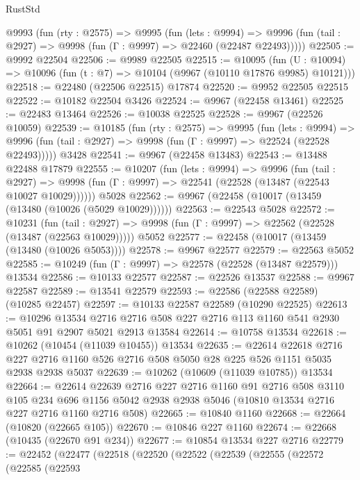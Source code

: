 \begin{lexlean}{RustStd}
\begin{coremodule}
{\begin{coremodule}
{{{{{{{{{{{{{{{{{{{{{{{{{{{{{{{{{{{{{{{{{{{{{{{{{{{{{{{{{{{{{{{{{{{{{{{{{{{{{{  @9993
    (fun (rty : @2575) =>
    @9995
      (fun (lets : @9994) =>
      @9996 (fun (tail : @2927) => @9998 (fun (Γ : @9997) => @22460 (@22487 @22493)))))
@22505 := @9992 @22504
@22506 := @9989 @22505
@22515 := @10095
    (fun (U : @10094) => @10096 (fun (t : @7) => @10104 (@9967 (@10110 @17876 @9985) @10121)))
@22518 := @22480 (@22506 @22515) @17874
@22520 := @9952 @22505 @22515
@22522 := @10182 @22504 @3426
@22524 := @9967 (@22458 @13461)
@22525 := @22483 @13464
@22526 := @10038 @22525
@22528 := @9967 (@22526 @10059)
@22539 := @10185
    (fun (rty : @2575) =>
    @9995
      (fun (lets : @9994) =>
      @9996 (fun (tail : @2927) => @9998 (fun (Γ : @9997) => @22524 (@22528 @22493)))))
    @3428
@22541 := @9967 (@22458 @13483)
@22543 := @13488 @22488 @17879
@22555 := @10207
    (fun (lets : @9994) =>
    @9996
      (fun (tail : @2927) =>
      @9998 (fun (Γ : @9997) => @22541 (@22528 (@13487 (@22543 @10027 @10029))))))
    @5028
@22562 := @9967 (@22458 (@10017 (@13459 (@13480 (@10026 (@5029 @10029))))))
@22563 := @22543 @5028
@22572 := @10231
    (fun (tail : @2927) => @9998 (fun (Γ : @9997) => @22562 (@22528 (@13487 (@22563 @10029)))))
    @5052
@22577 := @22458 (@10017 (@13459 (@13480 (@10026 @5053))))
@22578 := @9967 @22577
@22579 := @22563 @5052
@22585 := @10249 (fun (Γ : @9997) => @22578 (@22528 (@13487 @22579))) @13534
@22586 := @10133 @22577
@22587 := @22526 @13537
@22588 := @9967 @22587
@22589 := @13541 @22579
@22593 := @22586 (@22588 @22589) (@10285 @22457)
@22597 := @10133 @22587 @22589 (@10290 @22525)
@22613 := @10296
    @13534
    @2716
    @2716
    @508
    @227
    @2716
    @113
    @1160
    @541
    @2930
    @5051
    @91
    @2907
    @5021
    @2913
    @13584
@22614 := @10758 @13534
@22618 := @10262 (@10454 (@11039 @10455)) @13534
@22635 := @22614
    @22618
    @2716
    @227
    @2716
    @1160
    @526
    @2716
    @508
    @5050
    @28
    @225
    @526
    @1151
    @5035
    @2938
    @2938
    @5037
@22639 := @10262 (@10609 (@11039 @10785)) @13534
@22664 := @22614
    @22639
    @2716
    @227
    @2716
    @1160
    @91
    @2716
    @508
    @3110
    @105
    @234
    @696
    @1156
    @5042
    @2938
    @2938
    @5046
    (@10810 @13534 @2716 @227 @2716 @1160 @2716 @508)
@22665 := @10840 @1160
@22668 := @22664 (@10820 (@22665 @105))
@22670 := @10846 @227 @1160
@22674 := @22668 (@10435 (@22670 @91 @234))
@22677 := @10854 @13534 @227 @2716
@22779 := @22452
    (@22477
      (@22518
        (@22520
          (@22522
            (@22539
              (@22555
                (@22572
                  (@22585
                    (@22593
}}}}}}}}}}}}}}}}}}}}}}}}}}}}}}}}}}}}}}}}}}}}}}}}}}}}}}}}}}}}}}}}}}}}}}}}}}}}}}
\end{coremodule}}
\end{coremodule}
\end{lexlean}
